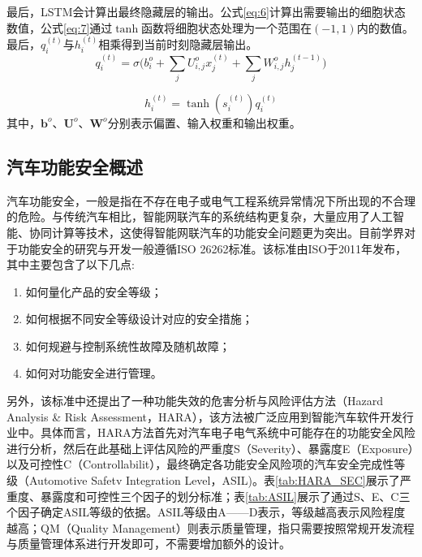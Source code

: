 最后，LSTM会计算出最终隐藏层的输出。公式\ref{eq:6}计算出需要输出的细胞状态数值，公式\ref{eq:7}通过$\tanh$函数将细胞状态处理为一个范围在$(-1,1)$内的数值。最后，$q_i^{(t)}$与$h_i^{(t)}$相乘得到当前时刻隐藏层输出。
\begin{equation}
    q_i^{(t)}=\sigma\bigg(b_i^o+\sum_jU^o_{i,j}x_j^{(t)}+\sum_jW_{i,j}^oh_j^{(t-1)}\bigg)
    \label{eq:6}
\end{equation}

\begin{equation}
    h_i^{(t)}=\tanh(s_i^{(t)})q_i^{(t)}
    \label{eq:7}
\end{equation}
其中，$\textbf{b}^o$、$\textbf{U}^o$、$\textbf{W}^o$分别表示偏置、输入权重和输出权重。

\subsection{汽车功能安全概述}
汽车功能安全，一般是指在不存在电子或电气工程系统异常情况下所出现的不合理的危险\cite{刘法旺2021自动驾驶系统功能安全与预期功能安全研究}。与传统汽车相比，智能网联汽车的系统结构更复杂，大量应用了人工智能、协同计算等技术，这使得智能网联汽车的功能安全问题更为突出。目前学界对于功能安全的研究与开发一般遵循ISO 26262标准。该标准由ISO于2011年发布，其中主要包含了以下几点\cite{iso_2018}:
\begin{enumerate}
    \item 如何量化产品的安全等级；
    \item 如何根据不同安全等级设计对应的安全措施；
    \item 如何规避与控制系统性故障及随机故障；
    \item 如何对功能安全进行管理。
\end{enumerate}
另外，该标准中还提出了一种功能失效的危害分析与风险评估方法（Hazard Analysis \& Risk Assessment，HARA），该方法被广泛应用到智能汽车软件开发行业中。具体而言，HARA方法首先对汽车电子电气系统中可能存在的功能安全风险进行分析，然后在此基础上评估风险的严重度S（Severity）、暴露度E（Exposure）以及可控性C（Controllabilit），最终确定各功能安全风险项的汽车安全完成性等级（Automotive Safetv Integration Level，ASIL)。表\ref{tab:HARA_SEC}展示了严重度、暴露度和可控性三个因子的划分标准；表\ref{tab:ASIL}展示了通过S、E、C三个因子确定ASIL等级的依据。ASIL等级由A——D表示，等级越高表示风险程度越高；QM（Quality Management）则表示质量管理，指只需要按照常规开发流程与质量管理体系进行开发即可，不需要增加额外的设计。
